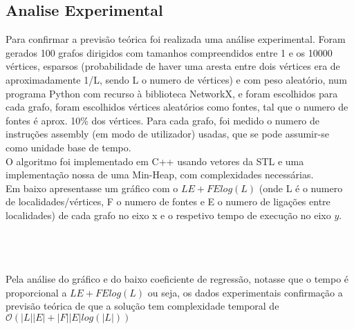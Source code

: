 \documentclass[12pt]{article}
\begin{document}
\subsection{Analise Experimental}
Para confirmar a previsão teórica foi realizada uma análise experimental. Foram gerados 100 grafos dirigidos com tamanhos compreendidos entre 1 e os 10000 vértices, esparsos (probabilidade de haver uma aresta entre dois vértices era de aproximadamente 1/L, sendo L o numero de vértices) e com peso aleatório, num programa Python com recurso à biblioteca NetworkX\cite{hagberg-2008-exploring}, e foram escolhidos para cada grafo, foram escolhidos vértices aleatórios como fontes, tal que o numero de fontes é aprox. 10\% dos vértices. Para cada grafo, foi medido o numero de instruções assembly (em modo de utilizador) usadas, que se pode assumir-se como unidade base de tempo.\\
\indent O algoritmo foi implementado em C++ usando vetores da STL e uma implementação nossa de uma Min-Heap, com complexidades necessárias.\\
\indent Em baixo apresentasse um gráfico com o $LE + FElog(L)$ (onde L é o numero de localidades/vértices, F o numero de fontes e E o numero de ligações entre localidades) de cada grafo no eixo x e o respetivo tempo de execução no eixo $y$.\\
\\
\\\\
Pela análise do gráfico e do baixo coeficiente de regressão, notasse que o tempo é proporcional a $LE + FElog(L)$  ou seja, os dados experimentais confirmação a previsão teórica de que a solução tem complexidade temporal de $\mathcal{O}(|L||E| + |F||E|log(|L|))$\\
\pagebreak
{}

\end{document}
